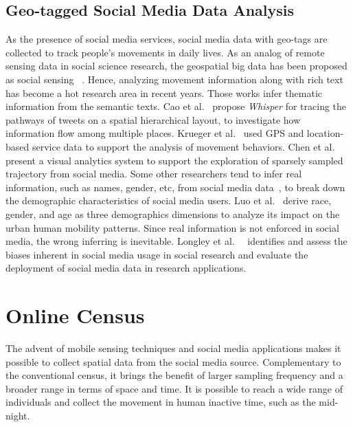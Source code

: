 \subsection{Geo-tagged Social Media Data Analysis}
As the presence of social media services, social media data with geo-tags are collected to track people's movements in daily lives. As an analog of remote sensing data in social science research, the geospatial big data has been proposed as social sensing ~\citep{liu2015social}. Hence, analyzing movement information along with rich text has become a hot research area in recent years. Those works infer thematic information from the semantic texts. Cao et al.~\citep{cao2012whisper} propose \textit{Whisper} for tracing the pathways of tweets on a spatial hierarchical layout, to investigate how information flow among multiple places. Krueger et al.~\citep{krueger2014visual} used GPS and location-based service data to support the analysis of movement behaviors. Chen et al.~\citep{chen2016interactive} present a visual analytics system to support the exploration of sparsely sampled trajectory from social media. Some other researchers tend to infer real information, such as names, gender, etc, from social media data~\citep{peddinti2014internet}, to break down the demographic characteristics of social media users. Luo et al.~\citep{luo2016explore} derive race, gender, and age as three demographics dimensions to analyze its impact on the urban human mobility patterns. Since real information is not enforced in social media, the wrong inferring is inevitable. Longley et al.~\citep{Longley2015}~\citep{Paul2016_twitter} identifies and assess the biases inherent in social media usage in social research and evaluate the deployment of social media data in research applications.

\section{Online Census}
The advent of mobile sensing techniques and social media applications makes it possible to collect spatial data from the social media source. Complementary to the conventional census, it brings the benefit of larger sampling frequency and a broader range in terms of space and time. It is possible to reach a wide range of individuals and collect the movement in human inactive time, such as the mid-night.



